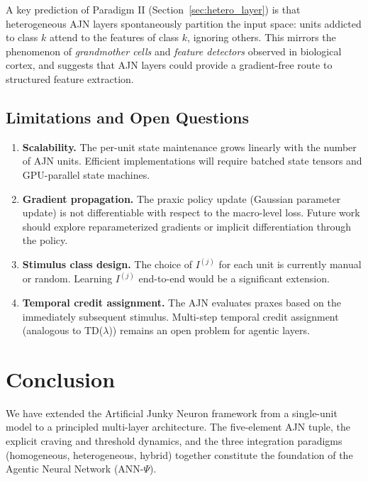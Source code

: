 \documentclass[12pt,a4paper]{article}
\begin{document}
A key prediction of Paradigm II (Section~\ref{sec:hetero_layer}) is that
heterogeneous AJN layers spontaneously partition the input space: units addicted
to class $k$ attend to the features of class $k$, ignoring others. This mirrors
the phenomenon of \textit{grandmother cells} and \textit{feature detectors}
observed in biological cortex, and suggests that AJN layers could provide a
gradient-free route to structured feature extraction.

\subsection{Limitations and Open Questions}

\begin{enumerate}
    \item \textbf{Scalability.} The per-unit state maintenance grows linearly with
    the number of AJN units. Efficient implementations will require batched
    state tensors and GPU-parallel state machines.

    \item \textbf{Gradient propagation.} The praxic policy update (Gaussian
    parameter update) is not differentiable with respect to the macro-level loss.
    Future work should explore reparameterized gradients or implicit differentiation
    through the policy.

    \item \textbf{Stimulus class design.} The choice of $I^{(j)}$ for each unit
    is currently manual or random. Learning $I^{(j)}$ end-to-end would be a
    significant extension.

    \item \textbf{Temporal credit assignment.} The AJN evaluates praxes based on
    the immediately subsequent stimulus. Multi-step temporal credit assignment
    (analogous to TD($\lambda$)) remains an open problem for agentic layers.
\end{enumerate}

\section{Conclusion}

We have extended the Artificial Junky Neuron framework from a single-unit model
to a principled multi-layer architecture. The five-element AJN tuple, the
explicit craving and threshold dynamics, and the three integration paradigms
(homogeneous, heterogeneous, hybrid) together constitute the foundation of the
Agentic Neural Network (ANN-$\Psi$).
\end{document}
